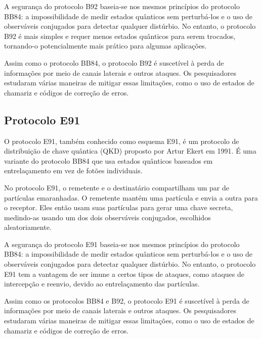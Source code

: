 A segurança do protocolo B92 baseia-se nos mesmos princípios do protocolo BB84: a impossibilidade de medir estados quânticos sem perturbá-los e o uso de observáveis conjugados para detectar qualquer distúrbio. No entanto, o protocolo B92 é mais simples e requer menos estados quânticos para serem trocados, tornando-o potencialmente mais prático para algumas aplicações.

Assim como o protocolo BB84, o protocolo B92 é suscetível à perda de informações por meio de canais laterais e outros ataques. Os pesquisadores estudaram várias maneiras de mitigar essas limitações, como o uso de estados de chamariz e códigos de correção de erros.

\subsection{Protocolo E91}

O protocolo E91, também conhecido como esquema E91, é um protocolo de distribuição de chave quântica (QKD) proposto por Artur Ekert em 1991. É uma variante do protocolo BB84 que usa estados quânticos baseados em entrelaçamento em vez de fotões individuais.

No protocolo E91, o remetente e o destinatário compartilham um par de partículas emaranhadas. O remetente mantém uma partícula e envia a outra para o receptor. Eles então usam suas partículas para gerar uma chave secreta, medindo-as usando um dos dois observáveis conjugados, escolhidos aleatoriamente.

A segurança do protocolo E91 baseia-se nos mesmos princípios do protocolo BB84: a impossibilidade de medir estados quânticos sem perturbá-los e o uso de observáveis conjugados para detectar qualquer distúrbio. No entanto, o protocolo E91 tem a vantagem de ser imune a certos tipos de ataques, como ataques de intercepção e reenvio, devido ao entrelaçamento das partículas.

Assim como os protocolos BB84 e B92, o protocolo E91 é suscetível à perda de informações por meio de canais laterais e outros ataques. Os pesquisadores estudaram várias maneiras de mitigar essas limitações, como o uso de estados de chamariz e códigos de correção de erros.

